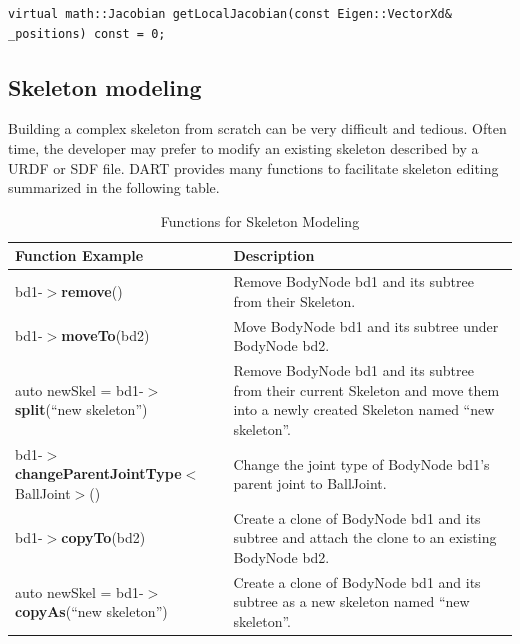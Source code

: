 \begin{lstlisting}[caption=Joint.h]
virtual math::Jacobian getLocalJacobian(const Eigen::VectorXd&
_positions) const = 0;
\end{lstlisting}






\subsection{Skeleton modeling}
\label{sec:skeleton_modeling}
Building a complex skeleton from scratch can be very
difficult and tedious. Often time, the developer may prefer to modify an
existing skeleton described by a URDF or SDF file. DART provides many
functions to facilitate skeleton editing summarized in the following
table.

\begin{table}[h]
\centering
\caption{Functions for Skeleton Modeling}
\begin{tabular}{|L{3.3in}|L{2.7in}|}
  \hline
  \textbf{Function Example} & \textbf{Description} \\
  \hline
  bd1-$>$\textbf{remove}() & Remove BodyNode bd1 and its subtree from their Skeleton.  \\
  \hline
   bd1-$>$\textbf{moveTo}(bd2) & Move BodyNode bd1 and its subtree under BodyNode bd2.  \\
  \hline
 auto newSkel = bd1-$>$\textbf{split}(``new skeleton'') & Remove BodyNode bd1 and its subtree from their current Skeleton and move them into a newly created Skeleton named ``new skeleton''.  \\
  \hline
 bd1-$>$\textbf{changeParentJointType}$<$BallJoint$>$() & Change the joint type of BodyNode bd1's parent joint to BallJoint.  \\
  \hline
bd1-$>$\textbf{copyTo}(bd2) & Create a clone of BodyNode bd1 and its subtree
                   and attach the clone to an existing BodyNode bd2. \\
  \hline
 auto newSkel = bd1-$>$\textbf{copyAs}(``new skeleton'') & Create a
                                                         clone of
                                                         BodyNode bd1
                                                         and its
                                                         subtree as a new skeleton named ``new skeleton''.  \\
  \hline
\end{tabular}
\label{tab:skeletonEdit}
\end{table}

